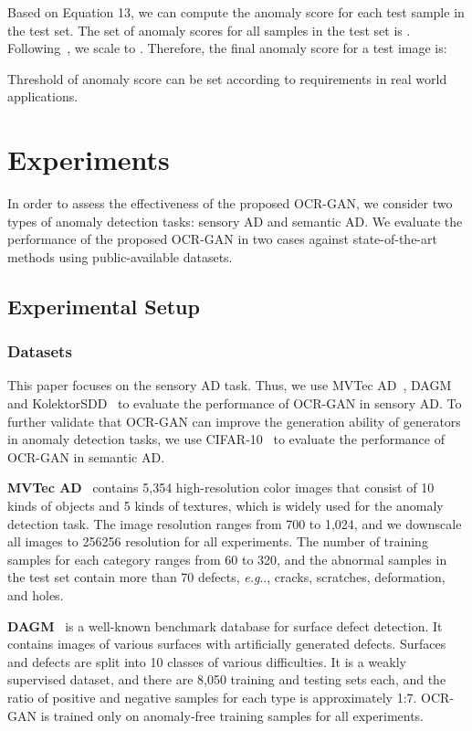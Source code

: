 \documentclass[lettersize,journal]{IEEEtran}
\makeatletter
\DeclareRobustCommand\onedot{\futurelet\@let@token\@onedot}
\def\@onedot{\ifx\@let@token.\else.\null\fi\xspace}
\def\eg{\emph{e.g}\onedot} \def\Eg{\emph{E.g}\onedot}
\makeatother
\begin{document}
Based on Equation 13, we can compute the anomaly score for each test sample in the test set. The set of anomaly scores for all samples in the test set is . Following~\cite{akccay2019skip}, we scale  to . Therefore, the final anomaly score for a test image  is:


Threshold of anomaly score can be set according to requirements in real world applications.

\section{Experiments}\label{sec:experiments}
In order to assess the effectiveness of the proposed OCR-GAN, we consider two types of anomaly detection tasks: sensory AD and semantic AD. We evaluate the performance of the proposed OCR-GAN in two cases against state-of-the-art methods using public-available datasets. 
\subsection{Experimental Setup}
\subsubsection{Datasets}
This paper focuses on the sensory AD task. Thus, we use MVTec AD~\cite{bergmann2019mvtec}, DAGM~\cite{wieler2007weakly} and KolektorSDD~\cite{Tabernik2019JIM} to evaluate the performance of OCR-GAN in sensory AD. To further validate that OCR-GAN can improve the generation ability of generators in anomaly detection tasks, we use CIFAR-10~\cite{krizhevsky2009learning} to evaluate the performance of OCR-GAN in semantic AD.
 
\noindent\textbf{MVTec AD}~\cite{bergmann2019mvtec} contains 5,354 high-resolution color images that consist of 10 kinds of objects and 5 kinds of textures, which is widely used for the anomaly detection task. The image resolution ranges from 700 to 1,024, and we downscale all images to 256256 resolution for all experiments. The number of training samples for each category ranges from 60 to 320, and the abnormal samples in the test set contain more than 70 defects, \eg, cracks, scratches, deformation, and holes.

\noindent\textbf{DAGM}~\cite{wieler2007weakly} is a well-known benchmark database for surface defect detection. It contains images of various surfaces with artificially generated defects. Surfaces and defects are split into 10 classes of various difficulties. It is a weakly supervised dataset, and there are 8,050 training and testing sets each, and the ratio of positive and negative samples for each type is approximately 1:7. OCR-GAN is trained only on anomaly-free training samples for all experiments. 
\end{document}

